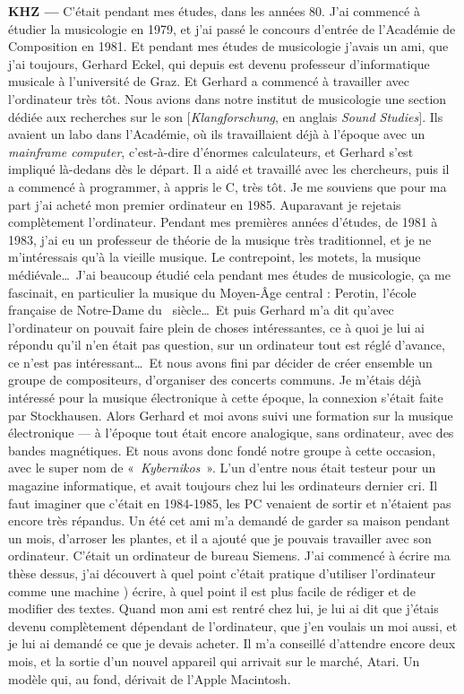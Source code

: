 \documentclass[a4paper,12pt]{article}
\newcommand{\guill}[1]{«~#1~»}
\begin{document}
\textbf{KHZ ---} C'était pendant mes études, dans les années 80. J'ai commencé à étudier la musicologie en 1979, et j'ai passé le concours d'entrée de l'Académie de Composition en 1981. Et pendant mes études de musicologie j'avais un ami, que j'ai toujours, Gerhard Eckel, qui depuis est devenu professeur d'informatique musicale à l'université de Graz. Et Gerhard a commencé à travailler avec l'ordinateur très tôt. Nous avions dans notre institut de musicologie une section dédiée aux recherches sur le son [\emph{Klangforschung}, en anglais \emph{Sound Studies}]. Ils avaient un labo dans l'Académie, où ils travaillaient déjà à l'époque avec un \emph{mainframe computer}, c'est-à-dire d'énormes calculateurs, et Gerhard s'est impliqué là-dedans dès le départ. Il a aidé et travaillé avec les chercheurs, puis il a commencé à programmer, à appris le C, très tôt. Je me souviens que pour ma part j'ai acheté mon premier ordinateur en 1985. Auparavant je rejetais complètement l'ordinateur. Pendant mes premières années d'études, de 1981 à 1983, j'ai eu un professeur de théorie de la musique très traditionnel, et je ne m'intéressais qu'à la vieille musique. Le contrepoint, les motets, la musique médiévale\dots~J'ai beaucoup étudié cela pendant mes études de musicologie, ça me fascinait, en particulier la musique du Moyen-Âge central : Perotin, l'école française de Notre-Dame du \XIIIe~siècle\dots~Et puis Gerhard m'a dit qu'avec l'ordinateur on pouvait faire plein de choses intéressantes, ce à quoi je lui ai répondu qu'il n'en était pas question, sur un ordinateur tout est réglé d'avance, ce n'est pas intéressant\dots~Et nous avons fini par décider de créer ensemble un groupe de compositeurs, d'organiser des concerts communs. Je m'étais déjà intéressé pour la musique électronique à cette époque, la connexion s'était faite par Stockhausen. Alors Gerhard et moi avons suivi une formation sur la musique électronique --- à l'époque tout était encore analogique, sans ordinateur, avec des bandes magnétiques. Et nous avons donc fondé notre groupe à cette occasion, avec le super nom de \guill{\emph{Kybernikos}}. L'un d'entre nous était testeur pour un magazine informatique, et avait toujours chez lui les ordinateurs dernier cri. Il faut imaginer que c'était en 1984-1985, les PC venaient de sortir et n'étaient pas encore très répandus. Un été cet ami m'a demandé de garder sa maison pendant un mois, d'arroser les plantes, et il a ajouté que je pouvais travailler avec son ordinateur. C'était un ordinateur de bureau Siemens. J'ai commencé à écrire ma thèse dessus, j'ai découvert à quel point c'était pratique d'utiliser l'ordinateur comme une machine ) écrire, à quel point il est plus facile de rédiger et de modifier des textes. Quand mon ami est rentré chez lui, je lui ai dit que j'étais devenu complètement dépendant de l'ordinateur, que j'en voulais un moi aussi, et je lui ai demandé ce que je devais acheter. Il m'a conseillé d'attendre encore deux mois, et la sortie d'un nouvel appareil qui arrivait sur le marché, Atari. Un modèle qui, au fond, dérivait de l'Apple Macintosh. %
\end{document}
